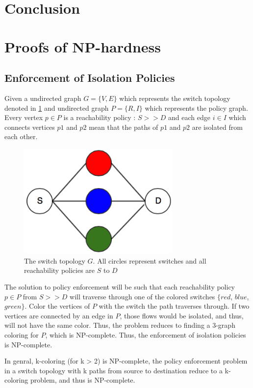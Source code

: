 \documentclass[]{sig}
\begin{document}
\section{Conclusion}
{}

 \appendix
 \section{Proofs of NP-hardness} \label{sec:np}
 \subsection{Enforcement of Isolation Policies} \label{sec:isolationNP}
 Given a undirected graph $G=\{V,E\}$ which represents the switch topology denoted in \cref{fig:swtopo} and undirected graph $P =\{R,I\}$ which represents the policy graph. Every vertex $p \in P$ is a reachability policy : $S >> D$ and each edge $i \in I$ which connects vertices $p1$ and $p2$ mean that the paths of $p1$ and $p2$ are isolated from each other. 
 \begin{figure}[H] 
 	\includegraphics[width=8cm]{color_topo.png}
 	\caption{The switch topology $G$. All circles represent switches and all reachability policies are $S$ to $D$}
 	\label{fig:swtopo}
 \end{figure}
The solution to policy enforcement will be such that each reachability policy $p \in P$ from $S >> D$ will traverse through one of the colored switches $\{red$, $blue$, $green\}$. Color the vertices of $P$ with the switch the path traverses through. If two vertices are connected by an edge in $P$, those flows would be isolated, and thus, will not have the same color. Thus, the problem reduces to finding a 3-graph coloring for $P$, which is NP-complete. Thus, the enforcement of isolation policies is NP-complete. 
 
 In genral, k-coloring (for k > 2) is NP-complete, the policy enforcement problem in a switch topology with k paths from source to destination reduce to a k-coloring problem, and thus is NP-complete. 
 
\end{document}
